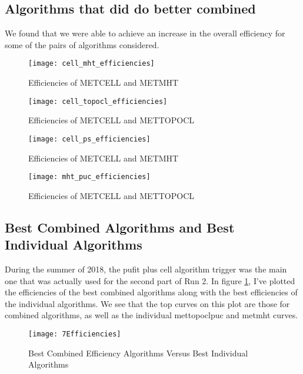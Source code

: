 \subsection{Algorithms that did do better combined}
We found that we were able to achieve an increase in the overall efficiency for some of the pairs of algorithms considered. 
\begin{figure}[h]
        \centering
        \texttt{[image: cell\_mht\_efficiencies]}
        \caption{Efficiencies of METCELL and METMHT}
\end{figure}
\begin{figure}[h]
        \centering
        \texttt{[image: cell\_topocl\_efficiencies]}
        \caption{Efficiencies of METCELL and METTOPOCL}
\end{figure}
\begin{figure}[h]
        \centering
        \texttt{[image: cell\_ps\_efficiencies]}
        \caption{Efficiencies of METCELL and METMHT}
\end{figure}
\begin{figure}[h]
        \centering
        \texttt{[image: mht\_puc\_efficiencies]}
        \caption{Efficiencies of METCELL and METTOPOCL}
\end{figure}
\clearpage
\subsection{Best Combined Algorithms and Best Individual Algorithms}
During the summer of 2018, the pufit plus cell algorithm trigger was the main one that was actually used for the second part of Run 2.
In figure \ref{bisection_fig}, I've plotted the efficiencies of the best combined algorithms along with the best efficiencies of the individual algorithms. We see that the top curves on this plot are those for combined algorithms, as well as the individual mettopoclpuc and metmht curves.
\begin{figure}[h]
        \centering
        \texttt{[image: 7Efficiencies]}
        \caption{Best Combined Efficiency Algorithms Versus Best Individual Algorithms}
        \label{bisection_fig}
\end{figure}
\clearpage

